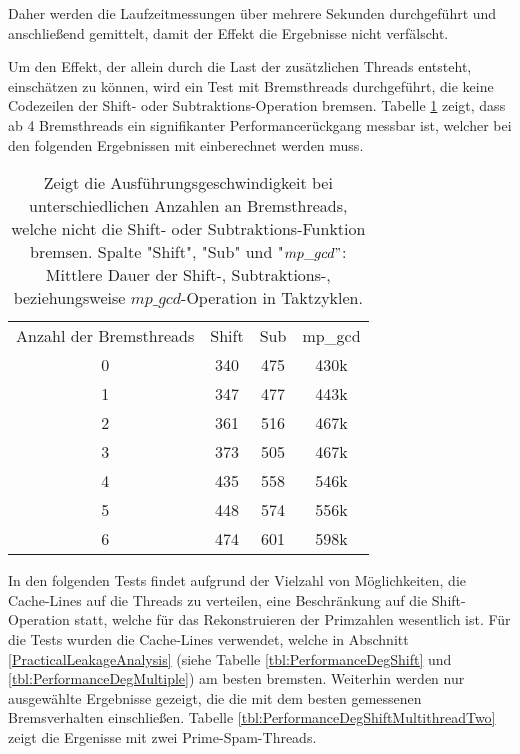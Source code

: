 Daher werden die Laufzeitmessungen über mehrere Sekunden durchgeführt und anschließend gemittelt, damit der Effekt die Ergebnisse nicht verfälscht.

Um den Effekt, der allein durch die Last der zusätzlichen Threads entsteht, einschätzen zu können, wird ein Test mit Bremsthreads durchgeführt, die keine Codezeilen der Shift- oder Subtraktions-Operation bremsen.
Tabelle \ref{tbl:PrimeSpamMultithreadRef} zeigt, dass ab 4 Bremsthreads ein signifikanter Performancerückgang messbar ist, welcher bei den folgenden Ergebnissen mit einberechnet werden muss.

\begin{table}[h]
\caption{Zeigt die Ausführungsgeschwindigkeit bei unterschiedlichen Anzahlen an Bremsthreads, welche nicht die Shift- oder Subtraktions-Funktion bremsen. Spalte "Shift", "Sub" und "$mp\_gcd"$: Mittlere Dauer der Shift-, Subtraktions-, beziehungsweise $mp\_gcd$-Operation in Taktzyklen.}
\label{tbl:PrimeSpamMultithreadRef}
\begin{tabular}{cccc}
Anzahl der Bremsthreads & Shift & Sub & mp\_gcd \\
0                      & 340   & 475 & 430k    \\
1                      & 347   & 477 & 443k    \\
2                      & 361   & 516 & 467k    \\
3                      & 373   & 505 & 467k    \\
4                      & 435   & 558 & 546k    \\
5                      & 448   & 574 & 556k    \\
6                      & 474   & 601 & 598k   
\end{tabular}
\end{table}

In den folgenden Tests findet aufgrund der Vielzahl von Möglichkeiten, die Cache-Lines auf die Threads zu verteilen, eine Beschränkung auf die Shift-Operation statt, welche für das Rekonstruieren der Primzahlen wesentlich ist.
Für die Tests wurden die Cache-Lines verwendet, welche in Abschnitt \ref{PracticalLeakageAnalysis} (siehe Tabelle \ref{tbl:PerformanceDegShift} und \ref{tbl:PerformanceDegMultiple}) am besten bremsten.
Weiterhin werden nur ausgewählte Ergebnisse gezeigt, die die mit dem besten gemessenen Bremsverhalten einschließen.
Tabelle \ref{tbl:PerformanceDegShiftMultithreadTwo} zeigt die Ergenisse mit zwei Prime-Spam-Threads.

